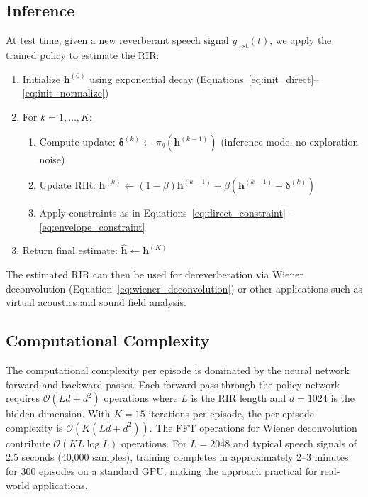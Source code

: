 \subsection{Inference}
\label{subsec:inference}

At test time, given a new reverberant speech signal $y_\text{test}(t)$, we apply the trained policy to estimate the RIR:

\begin{enumerate}
    \item Initialize $\mathbf{h}^{(0)}$ using exponential decay (Equations~\ref{eq:init_direct}--\ref{eq:init_normalize})
    \item For $k = 1, \ldots, K$:
    \begin{enumerate}
        \item Compute update: $\boldsymbol{\delta}^{(k)} \leftarrow \pi_\theta(\mathbf{h}^{(k-1)})$ (inference mode, no exploration noise)
        \item Update RIR: $\mathbf{h}^{(k)} \leftarrow (1-\beta)\mathbf{h}^{(k-1)} + \beta(\mathbf{h}^{(k-1)} + \boldsymbol{\delta}^{(k)})$
        \item Apply constraints as in Equations~\ref{eq:direct_constraint}--\ref{eq:envelope_constraint}
    \end{enumerate}
    \item Return final estimate: $\hat{\mathbf{h}} \leftarrow \mathbf{h}^{(K)}$
\end{enumerate}

The estimated RIR can then be used for dereverberation via Wiener deconvolution (Equation~\ref{eq:wiener_deconvolution}) or other applications such as virtual acoustics and sound field analysis.

\subsection{Computational Complexity}
\label{subsec:complexity}

The computational complexity per episode is dominated by the neural network forward and backward passes. Each forward pass through the policy network requires $\mathcal{O}(Ld + d^2)$ operations where $L$ is the RIR length and $d = 1024$ is the hidden dimension. With $K = 15$ iterations per episode, the per-episode complexity is $\mathcal{O}(K(Ld + d^2))$. The FFT operations for Wiener deconvolution contribute $\mathcal{O}(KL\log L)$ operations. For $L = 2048$ and typical speech signals of 2.5 seconds (40,000 samples), training completes in approximately 2--3 minutes for 300 episodes on a standard GPU, making the approach practical for real-world applications.
